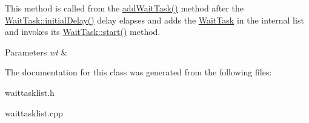This method is called from the \hyperlink{class_wait_worker_adaff9ea88795fa9d902711c1952828cd}{add\+Wait\+Task()} method after the \hyperlink{class_wait_task_a3984ae37eae1a984db2f2417df2bfbbf}{Wait\+Task\+::initial\+Delay()} delay elapses and adds the \hyperlink{class_wait_task}{Wait\+Task} in the internal list and invokes its \hyperlink{class_wait_task_ab20934c4c6723db758564eef74eec5c4}{Wait\+Task\+::start()} method. 


\begin{DoxyParams}{Parameters}
{\em wt} & \\
\hline
\end{DoxyParams}


The documentation for this class was generated from the following files\+:\begin{DoxyCompactItemize}
\item 
waittasklist.\+h\item 
waittasklist.\+cpp\end{DoxyCompactItemize}
